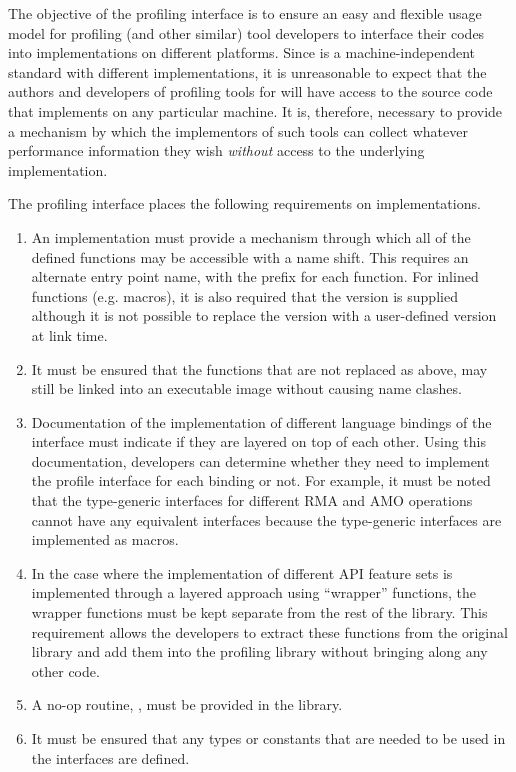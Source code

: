 The objective of the \openshmem profiling interface is to ensure an 
easy and flexible usage model for profiling (and other similar) 
tool developers to interface their codes into \openshmem 
implementations on different platforms. Since \openshmem is a 
machine-independent standard with different implementations, it is 
unreasonable to expect that the authors and developers of profiling 
tools for \openshmem will have access to the source code that 
implements \openshmem on any particular machine. It is, therefore,  
necessary to provide a mechanism by which the implementors of such 
tools can collect whatever performance information they wish 
\textit{without} access to the underlying implementation.

The \openshmem profiling interface places the following requirements 
on implementations. 

\begin{enumerate}
\item An \openshmem implementation must provide a mechanism through 
which all of the \openshmem defined functions may be accessible 
with a name shift. This requires an alternate 
entry point name, with the prefix  for each 
\openshmem function. For \openshmem inlined functions (e.g. macros), 
it is also required that the  version is supplied 
although it is not possible to replace the  version 
with a user-defined version at link time.
\item It must be ensured that the \openshmem functions that are not 
replaced as above, may still be linked into an executable image 
without causing name clashes. 
\item Documentation of the implementation of different language 
bindings of the \openshmem interface must indicate if they 
are layered on top of each other. Using this documentation,   
developers can determine whether they need to implement the 
profile interface for each binding or not. For example, it must 
be noted that the \openshmem \Cstd[11] type-generic interfaces for 
different RMA and AMO operations cannot have any equivalent 
 interfaces because the \Cstd[11] type-generic 
interfaces are implemented as macros.
\item In the case where the implementation of different API  
feature sets is implemented through a layered approach using 
``wrapper'' functions, the wrapper functions must be kept separate 
from the rest of the library. This requirement allows the developers 
to extract these functions from the original \openshmem library 
and add them into the profiling library without bringing along any 
other code.
\item A no-op routine, , must be provided 
in the \openshmem library.
\item It must be ensured that any types or constants that are 
needed to be used in the  interfaces are defined.
\end{enumerate}

